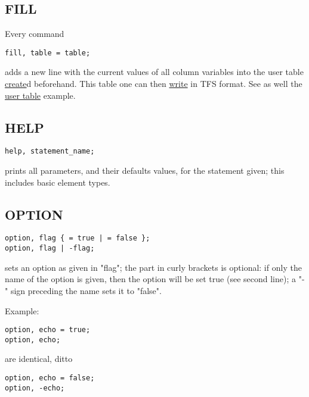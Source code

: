 \subsection{FILL} 
Every command 
\begin{verbatim}
fill, table = table;
\end{verbatim} 
adds a new line with the current values of all column variables into the
user table \hyperlink{create}{create}d beforehand. This table one can
then \hyperlink{write}{write} in TFS format.  See as well the
\href{../Introduction/select.html#ucreate}{user table} example.  

\subsection{HELP}
\begin{verbatim}
help, statement_name;
\end{verbatim}
prints all parameters, and their defaults values, for the statement given;
this includes basic element types.

\subsection{OPTION}
\label{subsec:general_option}
\begin{verbatim}
option, flag { = true | = false };
option, flag | -flag;
\end{verbatim} 
sets an option as given in "flag"; the part in curly brackets is
optional: if only the name of the option is given, then the option will
be set true (see second line); a "-" sign preceding the name sets it to
"false".  

Example: 
\begin{verbatim}
option, echo = true;
option, echo;
\end{verbatim} 
are identical, ditto 
\begin{verbatim}
option, echo = false;
option, -echo;
\end{verbatim} 

